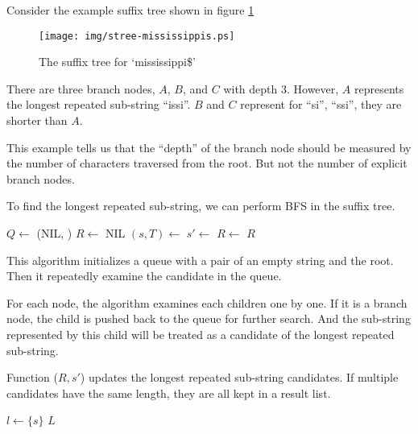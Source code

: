 \documentclass{article}
\begin{document}
Consider the example suffix tree shown in figure \ref{fig:stree-mississippis}

\begin{figure}[htbp]
  \centering
  \texttt{[image: img/stree-mississippis.ps]}
  \caption{The suffix tree for `mississippi\$'} \label{fig:stree-mississippis}
\end{figure}

There are three branch nodes, $A$, $B$, and $C$ with depth 3. However, $A$ represents
the longest repeated sub-string ``issi''. $B$ and $C$ represent for ``si'', ``ssi'',
they are shorter than $A$.

This example tells us that the ``depth'' of the branch node should be measured
by the number of characters traversed from the root. But not the number of
explicit branch nodes.

To find the longest repeated sub-string, we can perform BFS in the suffix tree.

\begin{algorithmic}[1]
  \State $Q \gets$ (NIL, )
  \State $R \gets$ NIL
    \State $(s, T) \gets$ 
        \State $s' \gets$ 
        \State {}
        \State $R \gets$ 
      \EndIf
    \EndFor
  \EndWhile
  \State \Return $R$
\EndFunction
\end{algorithmic}

This algorithm initializes a queue with a pair of an
empty string and the root. Then it repeatedly examine the candidate in the queue.

For each node, the algorithm examines each children one by one.
If it is a branch node, the child is pushed back
to the queue for further search. And the sub-string represented
by this child will be treated as a candidate of the
longest repeated sub-string.

Function ($R, s'$) updates the longest repeated
sub-string candidates. If multiple candidates have the same length, they
are all kept in a result list.

\begin{algorithmic}[1]
    \State \Return $l \gets \{ s \}$
  \EndIf
    \State \Return {}
  \EndIf
  \State \Return $L$
\EndFunction
\end{algorithmic}
\end{document}
